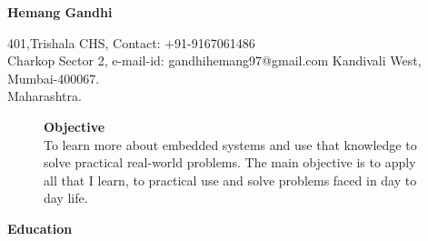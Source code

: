 \documentclass{article}
\begin{document}
	
	\begin{center}
		{
			\Large\textbf{Hemang Gandhi}
		}
		
	\end{center}
	
	\begin{flushleft}
		401,Trishala CHS, 		\hspace{2.8in}    		    Contact: +91-9167061486            \\
		Charkop Sector 2, 		\hspace{2.85in}		    e-mail-id: gandhihemang97@gmail.com \hspace{2.8in}
		Kandivali West, \\
		Mumbai-400067.     \\
		Maharashtra.\\
		
	\end{flushleft}
	\vspace{-0.3in}
	\begin{figure}[h]
		{%
		\hspace{4.4in}
\setlength{\fboxsep}{2.5pt}%
\setlength{\fboxrule}{1pt}%
%
}%
		\begin{flushleft}
\textrm{\textbf{Objective}}\\
\textrm{To learn more about embedded systems and use that knowledge to solve practical real-world problems. The main objective is to apply all that I learn, to practical use and solve problems faced in day to day life.}
\end{flushleft}
	\end{figure}
	
\begin{flushleft}
		
		\textbf{Education}
	\end{flushleft}
	
\end{document}
